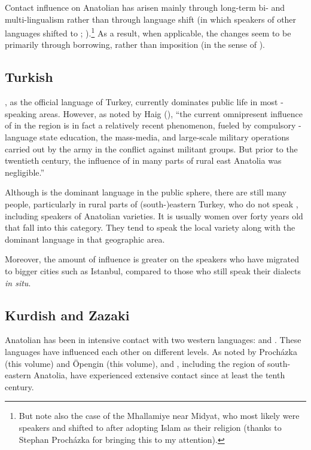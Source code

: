 \documentclass[output=paper]{langsci/langscibook}
\begin{document}
Contact influence on Anatolian  has arisen mainly through long-term bi- and multi-lingualism rather than through {language shift} (in which speakers of other languages shifted to ; \citealt{Thomason2001}).\footnote{But note also the case of the Mhallamiye near Midyat, who most likely were  speakers and shifted to  after adopting Islam as their religion (thanks to Stephan Procházka for bringing this to my attention).} As a result, when applicable, the changes seem to be primarily through borrowing, rather than {imposition} (in the sense of \citealt{VanCoetsem1988,VanCoetsem2000}).


\subsection{Turkish}
, as the official language of Turkey, currently dominates public life in most -speaking areas. However, as noted by Haig (\citeyear[14]{Haig2014}), ``the current omnipresent influence of  in the region is in fact a relatively recent phenomenon,
fueled by compulsory -language state education, the mass-media, and large-scale military operations carried out by the  army in the conflict against militant  groups. But prior to the twentieth century, the influence of  in many parts of rural east {Anatolia} was negligible.''

Although  is the dominant language in the public sphere, there are still many people, particularly in rural parts of (south-)eastern Turkey, who do not speak , including speakers of Anatolian  varieties. It is usually women over forty years old that fall into this category. They tend to speak the local  variety along with the dominant language in that geographic area.


Moreover, the amount of  influence is greater on the  speakers who have migrated to bigger cities such as Istanbul, compared to those who still speak their dialects \textit{in situ}.

\subsection{Kurdish and Zazaki}
Anatolian  has been in {intensive} contact with two western  languages:   and . These languages have influenced each other on different levels. As noted by Proch\'{a}zka (this volume) and Öpengin (this volume),  and , including the region of south-eastern {Anatolia}, have experienced extensive contact since at least the tenth century.
\end{document}
